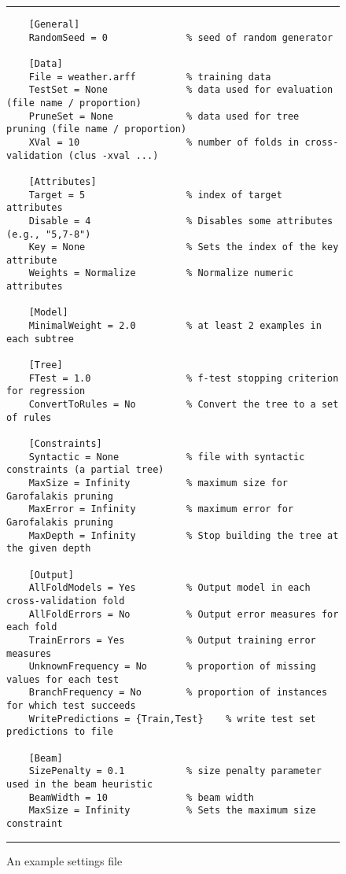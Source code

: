 \begin{figure}[tb]
	\hrule\vspace{1em}
	\begin{verbatim}
	[General]
	RandomSeed = 0              % seed of random generator
	
	[Data]
	File = weather.arff         % training data
	TestSet = None              % data used for evaluation (file name / proportion)
	PruneSet = None             % data used for tree pruning (file name / proportion)
	XVal = 10                   % number of folds in cross-validation (clus -xval ...)
	
	[Attributes]
	Target = 5                  % index of target attributes
	Disable = 4                 % Disables some attributes (e.g., "5,7-8")
	Key = None                  % Sets the index of the key attribute
	Weights = Normalize         % Normalize numeric attributes
	
	[Model]
	MinimalWeight = 2.0         % at least 2 examples in each subtree
	
	[Tree]
	FTest = 1.0                 % f-test stopping criterion for regression
	ConvertToRules = No         % Convert the tree to a set of rules
	
	[Constraints]
	Syntactic = None            % file with syntactic constraints (a partial tree)
	MaxSize = Infinity          % maximum size for Garofalakis pruning
	MaxError = Infinity         % maximum error for Garofalakis pruning
	MaxDepth = Infinity         % Stop building the tree at the given depth
	
	[Output]
	AllFoldModels = Yes         % Output model in each cross-validation fold
	AllFoldErrors = No          % Output error measures for each fold
	TrainErrors = Yes           % Output training error measures
	UnknownFrequency = No       % proportion of missing values for each test
	BranchFrequency = No        % proportion of instances for which test succeeds
	WritePredictions = {Train,Test}    % write test set predictions to file
	
	[Beam]
	SizePenalty = 0.1           % size penalty parameter used in the beam heuristic
	BeamWidth = 10              % beam width
	MaxSize = Infinity          % Sets the maximum size constraint
	\end{verbatim}
	\hrule
	\caption{An example settings file}
	\label{settings:fig}
\end{figure}
